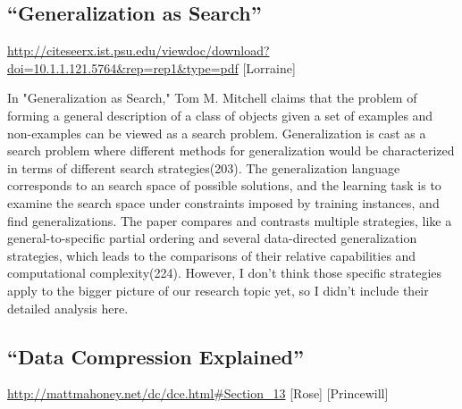 \documentclass[12pt]{article}
\begin{document}
\newpage

\subsection*{“Generalization as Search”}
\url{http://citeseerx.ist.psu.edu/viewdoc/download?doi=10.1.1.121.5764&rep=rep1&type=pdf} [Lorraine]

In "Generalization as Search," Tom M. Mitchell claims that the problem of forming a general description of a class of objects given a set of examples and non-examples can be viewed as a search problem. Generalization is cast as a search problem where different methods for generalization would be characterized in terms of different search strategies(203). The generalization language corresponds to an search space of possible solutions, and the learning task is to examine the search space under constraints imposed by training instances, and find generalizations. The paper compares and contrasts multiple strategies, like a general-to-specific partial ordering and several data-directed generalization strategies, which leads to the comparisons of their relative capabilities and computational complexity(224). However, I don't think those specific strategies apply to the bigger picture of our research topic yet, so I didn't include their detailed analysis here.

\newpage 

\subsection*{“Data Compression Explained”}
\url{http://mattmahoney.net/dc/dce.html#Section_13} [Rose] [Princewill]
\end{document}
